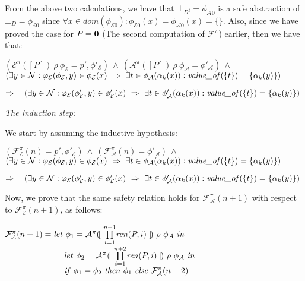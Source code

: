\documentclass[10pt,a4paper,final,oneside,fleqn]{book}
\begin{document}
\noindent
From the above two calculations, we have that $\bot_{D^\sharp}=\phi_{\mathcal{A}0}$ is a safe abstraction of $\bot_{D}=\phi_{\mathcal{E}0}$ since $\forall x\in dom(\phi_{\mathcal{E}0}):\phi_{\mathcal{E}0}(x)=\phi_{\mathcal{A}0}(x)=\{\}$.  Also, since we have proved the case for $P={\bf 0}$ (The second computation of $\mathcal{F}^\pi$) earlier, then we have that:

\noindent
$(\mathcal{E}^\pi(\![P]\!)~\rho~\phi_{\mathcal{E}}=p',\phi'_\mathcal{E})~\wedge~(\mathcal{A}^\pi(\![P]\!)~\rho~\phi_{\mathcal{A}}=\phi'_\mathcal{A})~\wedge$\\
$(\exists y\in\mathcal{N}:\varphi_\mathcal{E}(\phi_\mathcal{E},y)\in\phi_\mathcal{E}(x)~\Rightarrow~\exists t\in\phi_\mathcal{A}(\alpha_k(x)):\mbox{{\itshape value\_of\/}}(\{t\})=\{\alpha_k(y)\})$\vspace{5mm}

\noindent
$\Rightarrow~~~(\exists y\in\mathcal{N}:\varphi_\mathcal{E}(\phi'_\mathcal{E},y)\in\phi'_\mathcal{E}(x)~\Rightarrow~\exists t\in\phi'_\mathcal{A}(\alpha_k(x)):\mbox{{\itshape value\_of\/}}(\{t\})=\{\alpha_k(y)\})$\vspace{10mm}

\noindent
{\itshape The induction step:\/}\vspace{5mm}

\noindent
We start by assuming the inductive hypothesis:

\noindent
$(\mathcal{F}_\mathcal{E}^\pi(n)=p',\phi'_\mathcal{E})~\wedge~(\mathcal{F}_\mathcal{A}^\pi(n)=\phi'_\mathcal{A})~\wedge$\\
$(\exists y\in\mathcal{N}:\varphi_\mathcal{E}(\phi_\mathcal{E},y)\in\phi_\mathcal{E}(x)~\Rightarrow~\exists t\in\phi_\mathcal{A}(\alpha_k(x)):\mbox{{\itshape value\_of\/}}(\{t\})=\{\alpha_k(y)\})$\vspace{5mm}

\noindent
$\Rightarrow~~~(\exists y\in\mathcal{N}:\varphi_\mathcal{E}(\phi'_\mathcal{E},y)\in\phi'_\mathcal{E}(x)~\Rightarrow~\exists t\in\phi'_\mathcal{A}(\alpha_k(x)):\mbox{{\itshape value\_of\/}}(\{t\})=\{\alpha_k(y)\})$\vspace{5mm}

\noindent
Now, we prove that the same safety relation holds for $\mathcal{F}_\mathcal{A}^\pi(n+1)$ with respect to $\mathcal{F}_\mathcal{E}^\pi(n+1)$, as follows:

\noindent
$\mathcal{F}_\mathcal{A}^\pi(n+1)=\mbox{{\itshape let\/} }\phi_1=\mathcal{A}^\pi(\![~\underset{i=1}{\overset{n+1}{\prod}}\mbox{{\itshape ren\/}}(P,i)~]\!)~\rho~\phi_\mathcal{A}\mbox{ {\itshape in\/}}$\\
$\hspace{25mm}\mbox{{\itshape let\/} }\phi_2=\mathcal{A}^\pi(\![~\underset{i=1}{\overset{n+2}{\prod}}\mbox{{\itshape ren\/}}(P,i)~]\!)~\rho~\phi_\mathcal{A}\mbox{ {\itshape in\/}}$\\
$\hspace{25mm}\mbox{{\itshape if\/} }\phi_1=\phi_2\mbox{ {\itshape then\/} }\phi_1\mbox{ {\itshape else\/} }\mathcal{F}_\mathcal{A}^\pi(n+2)$\vspace{5mm}
\end{document}
